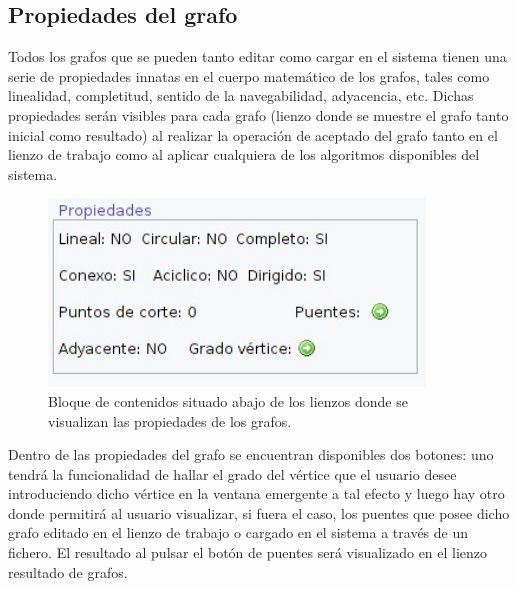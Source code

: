 \subsection{Propiedades del grafo}

Todos los grafos que se pueden tanto editar como cargar en el sistema tienen una serie de propiedades innatas en el cuerpo matemático de los grafos, tales como linealidad, completitud, sentido de la navegabilidad, adyacencia, etc. Dichas propiedades serán visibles para cada grafo (lienzo donde se muestre el grafo tanto inicial como resultado) al realizar la operación de aceptado del grafo tanto en el lienzo de trabajo como al aplicar cualquiera de los algoritmos disponibles del sistema. \\

\begin{figure}[H]
\begin{center}
\includegraphics[width=10cm]{./imagenes_documentacion/imagen_propiedades_grafo.jpeg}
\caption{Bloque de contenidos situado abajo de los lienzos donde se visualizan las propiedades de los grafos.}
\end{center}
\end{figure}

Dentro de las propiedades del grafo se encuentran disponibles dos botones: uno tendrá la funcionalidad de hallar el grado del vértice que el usuario desee introduciendo dicho vértice en la ventana emergente a tal efecto y luego hay otro donde permitirá al usuario visualizar, si fuera el caso, los puentes que posee dicho grafo editado en el lienzo de trabajo o cargado en el sistema a través de un fichero. El resultado al pulsar el botón de puentes será visualizado en el lienzo resultado de grafos. \\

